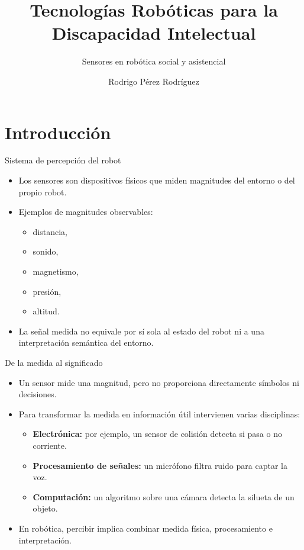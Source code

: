 \documentclass[aspectratio=169]{beamer}
\author{Rodrigo Pérez Rodríguez}
\title{Tecnologías Robóticas para la Discapacidad Intelectual}
\subtitle{Sensores en robótica social y asistencial}
\date{}
\begin{document}
\begin{frame}
    \titlepage
\end{frame}

\begin{frame}
    \tableofcontents[sectionstyle=show,subsectionstyle=show/shaded/hide,subsubsectionstyle=show/shaded/hide]
\end{frame}

\section{Introducción}

\begin{frame}{Sistema de percepción del robot}
\small
\begin{itemize}
  \item Los sensores son dispositivos físicos que miden magnitudes del entorno o del propio robot.
  \item Ejemplos de magnitudes observables:
  \begin{itemize}
    \item distancia,
    \item sonido,
    \item magnetismo,
    \item presión,
    \item altitud.
  \end{itemize}
  \item La señal medida no equivale por sí sola al estado del robot ni a una interpretación semántica del entorno.
\end{itemize}
\end{frame}

\begin{frame}{De la medida al significado}
\small
\begin{itemize}
  \item Un sensor mide una magnitud, pero no proporciona directamente símbolos ni decisiones.
  \item Para transformar la medida en información útil intervienen varias disciplinas:
  \begin{itemize}
    \item \textbf{Electrónica:} por ejemplo, un sensor de colisión detecta si pasa o no corriente.
    \item \textbf{Procesamiento de señales:} un micrófono filtra ruido para captar la voz.
    \item \textbf{Computación:} un algoritmo sobre una cámara detecta la silueta de un objeto.
  \end{itemize}
  \item En robótica, percibir implica combinar medida física, procesamiento e interpretación.
\end{itemize}
\end{frame}
\end{document}
